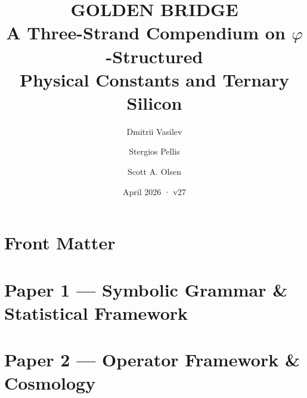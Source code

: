 \documentclass[11pt,a4paper]{book}
\title{\textbf{GOLDEN BRIDGE} \\[0.5em]
\large A Three-Strand Compendium on $\varphi$-Structured \\
Physical Constants and Ternary Silicon}
\author{Dmitrii Vasilev \and Stergios Pellis \and Scott A. Olsen}
\date{April 2026 · v27}
\begin{document}
\maketitle
\tableofcontents

\part*{Front Matter}













\part{Paper 1 --- Symbolic Grammar \& Statistical Framework}




















\part{Paper 2 --- Operator Framework \& Cosmology}














\end{document}
